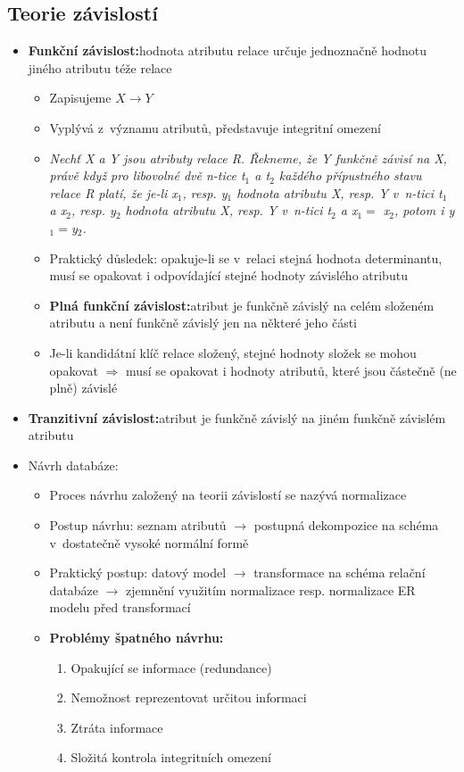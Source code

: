 \documentclass[a4paper,10pt]{article}
\newcommand{\pojem}[2]{\item \textbf{#1:}\quad #2}
\newcommand{\tedy}{$\Rightarrow$ }
\begin{document}
    \subsection{Teorie závislostí}
      \begin{itemize}
        \pojem{Funkční závislost}{hodnota atributu relace určuje jednoznačně hodnotu jiného atributu téže relace}
        \begin{itemize}
          \item Zapisujeme $X \rightarrow Y$
          \item Vyplývá z~významu atributů, představuje integritní omezení
          \item \emph{Nechť X a Y jsou atributy relace R. Řekneme, že Y funkčně závisí na X, právě když pro libovolné dvě n-tice t$_1$ a t$_2$ každého přípustného stavu relace R platí, že je-li x$_1$, resp. y$_1$ hodnota atributu X, resp. Y v~n-tici t$_1$ a x$_2$, resp. y$_2$ hodnota atributu X, resp. Y v~n-tici t$_2$ a x$_1 = $ x$_2$, potom i y$_1 = $y$_2$.}
          \item Praktický důsledek: opakuje-li se v~relaci stejná hodnota determinantu, musí se opakovat i odpovídající stejné hodnoty závislého atributu

          \pojem{Plná funkční závislost}{atribut je funkčně závislý na celém složeném atributu a není funkčně závislý jen na některé jeho části}
          \item Je-li kandidátní klíč relace složený, stejné hodnoty složek se mohou opakovat \tedy musí se opakovat i hodnoty atributů, které jsou částečně (ne plně) závislé
        \end{itemize}
        \pojem{Tranzitivní závislost}{atribut je funkčně závislý na jiném funkčně závislém atributu}

        \item Návrh databáze:
        \begin{itemize}
          \item Proces návrhu založený na teorii závislostí se nazývá normalizace
          \item Postup návrhu: seznam atributů $\rightarrow$ postupná dekompozice na schéma v~dostatečně vysoké normální formě
          \item Praktický postup: datový model $\rightarrow$ transformace na schéma relační databáze $\rightarrow$ zjemnění využitím normalizace resp. normalizace ER modelu před transformací
          \pojem{Problémy špatného návrhu}
          \begin{enumerate}
            \item Opakující se informace (redundance)
            \item Nemožnost reprezentovat určitou informaci
            \item Ztráta informace
            \item Složitá kontrola integritních omezení
          \end{enumerate}
        \end{itemize}
      \end{itemize}
\end{document}
